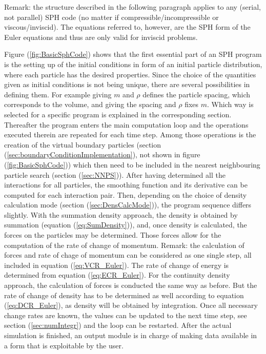 \documentclass{report}
\begin{document}
Remark: the structure described in the following paragraph applies to any (serial, not parallel) SPH code (no matter if compressible/incompressible or viscous/inviscid). The equations referred to, however, are the SPH form of the Euler equations and thus are only valid for inviscid problems.

Figure (\ref{fig:BasicSphCode}) shows that the first essential part of an SPH program is the setting up of the initial conditions in form of an initial particle distribution, where each particle has the desired properties.
Since the choice of the quantities given as 
initial conditions is not being unique, there are several possibilities in defining 
them. For example giving $m$ and $\rho$ defines the particle spacing, which corresponds to the volume, and giving the spacing and $\rho$ fixes $m$. Which way is selected for a specific program is explained in the corresponding section. 
Thereafter the program enters the main computation loop and the operations executed 
therein are repeated for each time step. Among those operations is the creation of the 
virtual boundary particles (section (\ref{sec:boundaryConditionImplementation}), not shown in figure (\ref{fig:BasicSphCode})) which then 
need to be included in the nearest neighbouring particle search (section (\ref{sec:NNPS})). 
After having determined all the interactions for all particles, the smoothing function 
and its derivative can be computed for each interaction pair. Then, depending on the 
choice of density calculation mode (section (\ref{sec:DensCalcMode})), the program sequence differs slightly. 
With the summation density approach, the density is obtained by summation 
(equation (\ref{eq:SumDensity})), and, once density is calculated, the forces on the 
particles may be determined. Those forces allow for the computation of the rate
of change of momentum. Remark: the calculation of forces and rate of chage of  momentum 
can be considered as one single step, all included in equation (\ref{eq:VCR_Euler}). The rate of change of energy is determined from equation (\ref{eq:ECR_Euler}).
For the continuity density approach, the calculation of forces is conducted the same way as before. But the rate of change of density 
has to be determined as well according to equation (\ref{eq:DCR_Euler}), as density will be obtained by integration. 
Once all necessary change rates are known, the values can be updated to the next time step, see section (\ref{sec:numIntegr}) and the loop can be restarted. After the actual simulation is finished, an output module is in charge of making data available in a form that is exploitable by the user.
\end{document}
